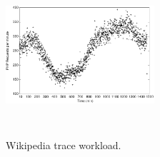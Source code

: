



\begin{figure}
\begin{center}
\includegraphics[width=0.49\textwidth, height=6cm]{./images/traceWorkload}
\end{center}
\vspace{-5mm}
\caption{Wikipedia trace workload.}
\label{workload}
\end{figure}





